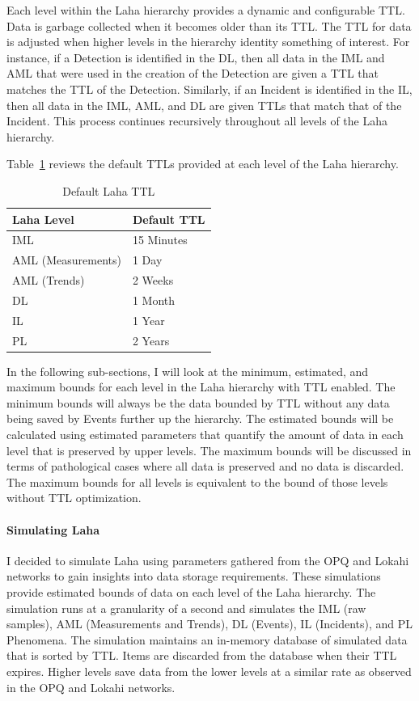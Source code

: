 Each level within the Laha hierarchy provides a dynamic and configurable TTL. Data is garbage collected when it becomes older than its TTL. The TTL for data is adjusted when higher levels in the hierarchy identity something of interest. For instance, if a Detection is identified in the DL, then all data in the IML and AML that were used in the creation of the Detection are given a TTL that matches the TTL of the Detection. Similarly, if an Incident is identified in the IL, then all data in the IML, AML, and DL are given TTLs that match that of the Incident. This process continues recursively throughout all levels of the Laha hierarchy.

Table~\ref{table:ttl_summary} reviews the default TTLs provided at each level of the Laha hierarchy.

\begin{table}[H]
	\centering
	\caption{Default Laha TTL}
	\begin{tabularx}{\textwidth}{ll}
		\toprule
		\textbf{Laha Level} & \textbf{Default TTL} \\
		\midrule
		IML & 15 Minutes \\
		AML (Measurements) & 1 Day \\
		AML (Trends) & 2 Weeks \\
		DL & 1 Month \\
		IL & 1 Year \\
		PL & 2 Years \\
		\bottomrule
	\end{tabularx}
	\label{table:ttl_summary}
\end{table}

In the following sub-sections, I will look at the minimum, estimated, and maximum bounds for each level in the Laha hierarchy with TTL enabled. The minimum bounds will always be the data bounded by TTL without any data being saved by Events further up the hierarchy. The estimated bounds will be calculated using estimated parameters that quantify the amount of data in each level that is preserved by upper levels. The maximum bounds will be discussed in terms of pathological cases where all data is preserved and no data is discarded. The maximum bounds for all levels is equivalent to the bound of those levels without TTL optimization.

\paragraph{Simulating Laha}

I decided to simulate Laha using parameters gathered from the OPQ and Lokahi networks to gain insights into data storage requirements. These simulations provide estimated bounds of data on each level of the Laha hierarchy. The simulation runs at a granularity of a second and simulates the IML (raw samples), AML (Measurements and Trends), DL (Events), IL (Incidents), and PL Phenomena. The simulation maintains an in-memory database of simulated data that is sorted by TTL. Items are discarded from the database when their TTL expires. Higher levels save data from the lower levels at a similar rate as observed in the OPQ and Lokahi networks.

